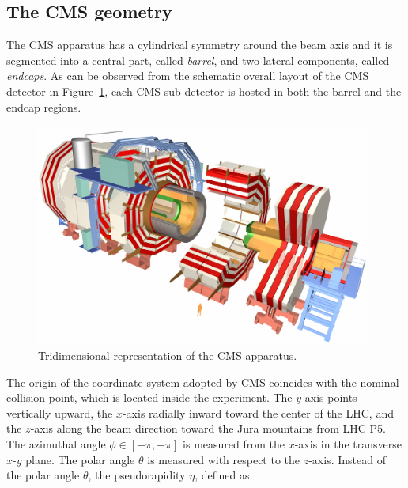 \subsection{The CMS geometry}
\label{subsec:CMSgeometry}

The CMS apparatus has a cylindrical symmetry around the beam axis and it is
segmented into a central part, called \emph{barrel}, and two lateral components, called 
\emph{endcaps}. As can be observed from the schematic overall layout of the CMS detector
in Figure~\ref{fig:CMSview}, each CMS sub-detector is hosted in both the barrel and the endcap regions.

\begin{figure}[hbt]
  \begin{center}
    \includegraphics[width=0.98\textwidth]{figDetector/CMSnc.jpg}
    \caption{Tridimensional representation of the CMS apparatus.} 
    \label{fig:CMSview}
  \end{center}
\end{figure}

The origin of the coordinate system adopted by CMS coincides with the nominal collision point,
which is located inside the experiment. The $y$-axis points vertically upward,
the $x$-axis radially inward toward the center of the LHC, and the $z$-axis
along the beam direction toward the Jura mountains from LHC P5. 
The azimuthal angle $\phi\in[-\pi,+\pi]$ is measured from the $x$-axis 
in the transverse $x$-$y$ plane. The polar angle $\theta$ is measured with respect to the $z$-axis. 
Instead of the polar angle $\theta$, the pseudorapidity $\eta$, defined as

